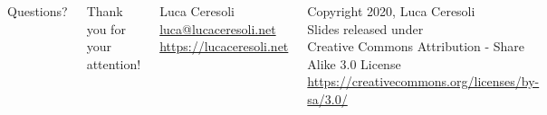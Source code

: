 \documentclass[xetex,table]{beamer}
\begin{document}
\begin{frame}
  \begin{columns}
    \center

    {\Huge Questions?}

    \center

    {\Large Thank you for your attention!}

    \vspace{0.15\textheight}

    {\Large Luca Ceresoli}\\
    \href{mailto:luca@lucaceresoli.net}{luca@lucaceresoli.net}\\
    \url{https://lucaceresoli.net}

    \vspace{0.05\textheight}

    \tiny
    \textcopyright{} Copyright 2020, Luca Ceresoli\\
    Slides released under\\
    Creative Commons Attribution - Share Alike 3.0 License \\
    \url{https://creativecommons.org/licenses/by-sa/3.0/} \\
\end{columns}
\end{frame}
\end{document}
